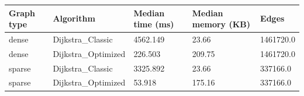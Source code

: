 \begin{tabular}{lllll}
\toprule
Graph type & Algorithm & Median time (ms) & Median memory (KB) & Edges \\
\midrule
dense & Dijkstra\_Classic & 4562.149 & 23.66 & 1461720.0 \\
dense & Dijkstra\_Optimized & 226.503 & 209.75 & 1461720.0 \\
sparse & Dijkstra\_Classic & 3325.892 & 23.66 & 337166.0 \\
sparse & Dijkstra\_Optimized & 53.918 & 175.16 & 337166.0 \\
\bottomrule
\end{tabular}
